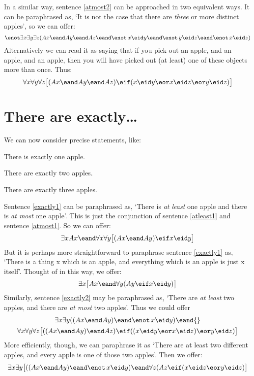 In a similar way, sentence \ref{atmost2} can be approached in two equivalent ways. It can be paraphrased as, `It is not the case that there are \emph{three} or more distinct apples', so we can offer:
$$\enot \exists x \exists y\exists z(Ax \eand Ay \eand Az \eand \enot\, x\eid y \eand \enot\, y\eid z \eand \enot\, x\eid z)$$
Alternatively we can read it as saying that if you pick out an apple, and an apple, and an apple, then you will have picked out (at least) one of these objects more than once. Thus:
$$\forall x\forall y\forall z\bigl[(Ax \eand Ay \eand Az) \eif (x\eid y \eor x\eid z \eor y\eid z)\bigr]$$


\section{There are exactly\ldots}
We can now consider precise statements, like:
\begin{earg}
\item[\ex{exactly1}] There is exactly one apple.
\item[\ex{exactly2}] There are exactly two apples.
\item[\ex{exactly3}] There are exactly three apples.
\end{earg}
Sentence \ref{exactly1} can be paraphrased as, `There is \emph{at least} one apple and there is \emph{at most} one apple'. This is just the conjunction of sentence \ref{atleast1} and sentence \ref{atmost1}. So we can offer:
$$\exists x Ax \eand \forall x\forall y\bigl[(Ax \eand Ay) \eif x\eid y\bigr]$$
But it is perhaps more straightforward to paraphrase sentence \ref{exactly1} as, `There is a thing x which is an apple, and everything which is an apple is just x itself'. Thought of in this way, we offer:
$$\exists x\bigl[Ax \eand \forall y(Ay \eif x\eid  y)\bigr]$$
Similarly, sentence \ref{exactly2} may be paraphrased as, `There are \emph{at least} two apples, and there are \emph{at most} two apples'. Thus we could offer
\begin{multline*}
  \exists x \exists y((Ax \eand Ay) \eand \enot\, x\eid y) \eand {}\\
  \forall x\forall y\forall z\bigl[((Ax \eand Ay) \eand Az) \eif ((x\eid y \eor x\eid z) \eor y\eid z)\bigr]
\end{multline*}
More efficiently, though, we can paraphrase it as `There are at least two different apples, and every apple is one of those two apples'. Then we offer:
$$\exists x\exists y\bigl[((Ax \eand Ay) \eand \enot\, x\eid y) \eand \forall z(Az \eif ( x\eid  z \eor y \eid z)\bigr]$$
